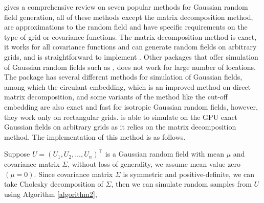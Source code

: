 \documentclass[article,nojss]{jss}\usepackage[]{graphicx}\usepackage[]{color}
\begin{document}
\cite{LiuandLi2019} gives a comprehensive review on seven popular methods for Gaussian random field generation, %
all of these methods except the matrix decomposition method, are approximations to the random field and have specific requirements on the type of grid or covariance functions. The matrix decomposition method is exact, it works for all covariance functions and can generate random fields on arbitrary grids, and is straightforward to implement \citep{LiuandLi2019}. Other  packages that offer simulation of Gaussian random fields such as  \citep{geoR2001}, does not work for large number of locations. The  \citep{RandomFields2015} package has several different methods for simulation of Gaussian fields, among which the circulant embedding, which is an improved method on direct matrix decomposition, and some variants of the method like the cut-off embedding \citep{gneiting2006fast} are also exact and fast for isotropic Gaussian random fields, however, they work only on rectangular grids.  is able to simulate on the GPU exact Gaussian fields on arbitrary grids as it relies on the matrix decomposition method. The implementation of this method is as follows.


Suppose $U=(U_1, U_2, \dots, U_n)^\top$ is a Gaussian random field with mean $\mu$ and covariance matrix $\Sigma$, without loss of generality, we assume mean value zero $(\mu = 0)$. Since covariance matrix $\Sigma$ is symmetric and positive-definite, we can take Cholesky decomposition of $\Sigma$, then we can simulate random samples from $U$ using Algorithm \ref{algorithm2},
\end{document}
